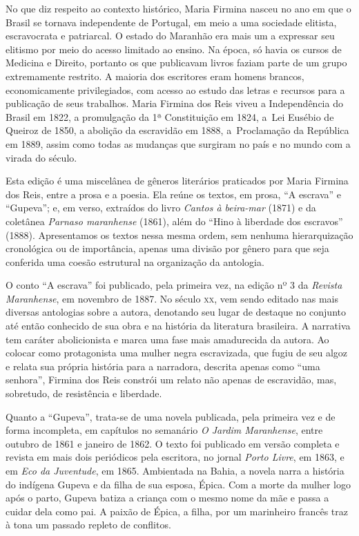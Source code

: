 \documentclass[12pt]{extarticle}
\begin{document}
No que diz respeito ao contexto histórico, Maria Firmina nasceu no ano
em que o Brasil se tornava independente de Portugal, em meio a uma
sociedade elitista, escravocrata e patriarcal. O estado do Maranhão era
mais um a expressar seu elitismo por meio do acesso limitado ao ensino.
Na época, só havia os cursos de Medicina e Direito, portanto os que
publicavam livros faziam parte de um grupo extremamente restrito. A
maioria dos escritores eram homens brancos, economicamente
privilegiados, com acesso ao estudo das letras e recursos para a
publicação de seus trabalhos. Maria Firmina dos Reis viveu a
Independência do Brasil em 1822, a promulgação da 1ª Constituição em
1824, a~Lei Eusébio de Queiroz de 1850, a abolição da escravidão em
1888, a~Proclamação da República em 1889, assim como todas as mudanças
que surgiram no país e no mundo com a virada do século.

Esta edição é uma miscelânea de gêneros literários praticados por Maria
Firmina dos Reis, entre a prosa e a poesia. Ela reúne os textos, em
prosa, ``A escrava'' e ``Gupeva''; e, em verso, extraídos do livro
\emph{Cantos à beira-mar} (1871) e da coletânea \emph{Parnaso
maranhense} (1861), além do ``Hino à liberdade dos escravos'' (1888).
Apresentamos os textos nessa mesma ordem, sem nenhuma hierarquização
cronológica ou de importância, apenas uma divisão por gênero para que
seja conferida uma coesão estrutural na organização da antologia.

O conto ``A escrava'' foi publicado, pela primeira vez, na edição nº 3
da \emph{Revista Maranhense}, em novembro de 1887. No século \textsc{xx}, vem
sendo editado nas mais diversas antologias sobre a autora, denotando seu
lugar de destaque no conjunto até então conhecido de sua obra e na
história da literatura brasileira. A narrativa tem caráter abolicionista
e marca uma fase mais amadurecida da autora. Ao colocar como
protagonista uma mulher negra escravizada, que fugiu de seu algoz e
relata sua própria história para a narradora, descrita apenas como ``uma
senhora'', Firmina dos Reis constrói um relato não apenas de escravidão,
mas, sobretudo, de resistência e liberdade.

Quanto a ``Gupeva'', trata-se de uma novela publicada, pela primeira vez
e de forma incompleta, em capítulos no semanário \emph{O Jardim
Maranhense}, entre outubro de 1861 e janeiro de 1862. O texto foi
publicado em versão completa e revista em mais dois periódicos pela
escritora, no jornal \emph{Porto Livre}, em 1863, e em \emph{Eco da
Juventude}, em 1865. Ambientada na Bahia, a novela narra a história do
indígena Gupeva e da filha de sua esposa, Épica. Com a morte da mulher
logo após o parto, Gupeva batiza a criança com o mesmo nome da mãe e
passa a cuidar dela como pai. A paixão de Épica, a filha, por um
marinheiro francês traz à tona um passado repleto de conflitos.
\end{document}

